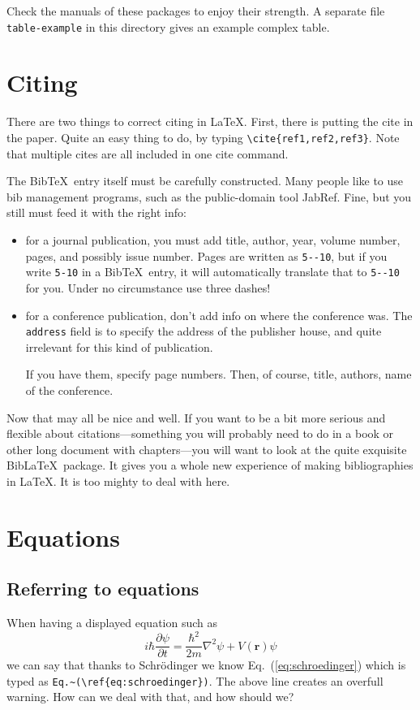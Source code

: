 \documentclass{article}
\begin{document}
Check the manuals of these packages to enjoy their strength.  A separate file  \texttt{table-example} in this directory gives an example complex table.





\section{Citing}
There are two things to correct citing in \LaTeX.  First, there is putting the cite in the paper. Quite an easy thing to do, by typing \verb+\cite{ref1,ref2,ref3}+. Note that multiple cites are all included in one cite command.

The Bib\TeX\ entry itself must be carefully constructed.  Many people like to use bib management programs, such as the public-domain tool JabRef.  Fine, but you still must feed it with the right info:
\begin{itemize}
\item for a journal publication, you must add title, author, year, volume number,
pages, and possibly issue number.  Pages are written as \verb+5--10+, but if you write \verb+5-10+ in a Bib\TeX\ entry, it will automatically translate that to \verb+5--10+ for you.  Under no circumstance use three dashes!

\item for a conference publication, don't add info on where the conference was. The \verb+address+ field is to specify the address of the publisher house, and quite irrelevant for this kind of publication.

If you have them, specify page numbers.  Then, of course, title, authors, name of the  conference.
\end{itemize}
Now that may all be nice and well.  If you want to be a bit more serious and flexible about citations---something you will probably need to do in a book or other long document with chapters---you will want to look at the quite exquisite Bib\LaTeX\ package.  It gives you a whole new experience of making bibliographies in \LaTeX.  It is too mighty to deal with here.


\section{Equations}
\subsection{Referring to equations}\label{sec:refereq}
When having a displayed equation such as
\begin{equation}\label{eq:schroedinger}
i\hbar\frac{\partial\psi}{\partial t} = \frac{\hbar^2}{2m}\nabla^2\psi + V(\mathbf{r})\psi
\end{equation}
we can say that thanks to Schr\"odinger we know Eq.~(\ref{eq:schroedinger}) which is typed as \verb+Eq.~(\ref{eq:schroedinger})+.
The above line creates an overfull warning.  How can we deal with that, and how should we?
\end{document}
